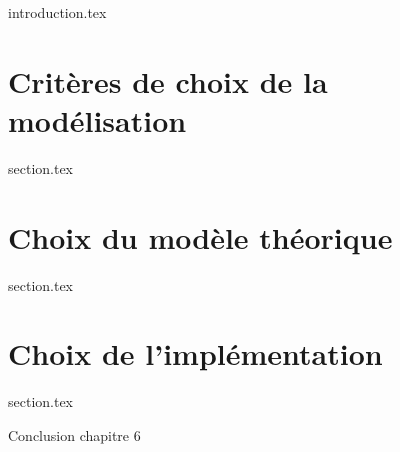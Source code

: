 %

\chaptertoc{}

\label{chap:06-int}
{introduction.tex}

\section{Critères de choix de la modélisation}
\label{chap:06-sec1}
{section.tex}

\section{Choix du modèle théorique}
\label{chap:06-sec2}
{section.tex}

\section{Choix de l'implémentation}
\label{chap:06-sec3}
{section.tex}


Conclusion chapitre 6

